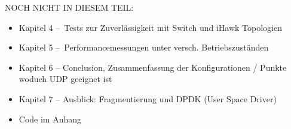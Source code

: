 \documentclass[
    paper = a4,
    fontsize = 12pt,
    headinclude = true,
    open = right,
    twoside = false,
    BCOR = 10mm,
    toc = listofnumbered,
    toc = bibnumbered,
    numbers = noendperiod
]{scrreprt}
\begin{document}
	

    
    
    \tableofcontents					%
    

    
    \cleardoublepage
    \setlength{\parindent}{0pt}			%
    \setlength{\parskip}{10pt}			%
    
    
    
    
    
    


	NOCH NICHT IN DIESEM TEIL:
	\begin{itemize}
		\item Kapitel 4 – Tests zur Zuverlässigkeit mit Switch und iHawk Topologien
		\item Kapitel 5 – Performancemessungen unter versch. Betriebszuständen
		\item Kapitel 6 – Conclusion, Zusammenfassung der Konfigurationen / Punkte woduch UDP geeignet ist
		\item Kapitel 7 – Ausblick: Fragmentierung und DPDK (User Space Driver)
		\item Code im Anhang
	\end{itemize}
	
	
	
	
    
    
    \begin{appendix}
    	

		\listoffigures
		\listoftables
		\lstlistoflistings
    \end{appendix}
    
\end{document}
